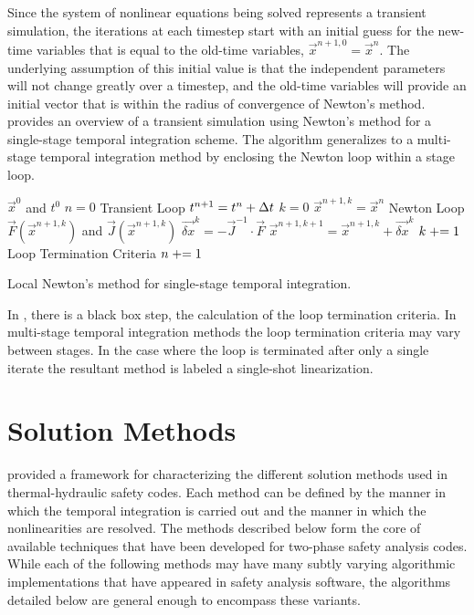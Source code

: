 Since the system of nonlinear equations being solved represents a transient simulation, the iterations at each timestep start with an initial guess for the new-time variables that is equal to the old-time variables, $\vec{x}^{n+1,0} = \vec{x}^{n}$.
The underlying assumption of this initial value is that the independent parameters will not change greatly over a timestep, and the old-time variables will provide an initial vector that is within the radius of convergence of Newton's method.
 provides an overview of a transient simulation using Newton's method for a single-stage temporal integration scheme.
The algorithm generalizes to a multi-stage temporal integration method by enclosing the Newton loop within a stage loop.

\begin{algo}[ht!]
\setlength{\baselineskip}{0.625\baselineskip}
\begin{algorithmic}[1]
\Require $\vec{x}^{0}$ and $t^{0}$
\Set $n = 0$
\Loop \; Transient Loop
    \Set $t^{n+1} = t^{n} + \dt{}$
    \Set $k = 0$
    \Set $\vec{x}^{n+1,k} = \vec{x}^{n}$
    \Loop \; Newton Loop
		\Calculate $\vec{F}(\vec{x}^{n+1,k})$ and $\vec{J}(\vec{x}^{n+1,k})$
		\Calculate $\vec{\delta x}^k = - \vec{J}^{-1}\cdot\vec{F}$
		\Calculate $\vec{x}^{n+1,k+1} = \vec{x}^{n+1, k} + \vec{\delta x}^{k}$
		\Set $k \mathrel{+}= 1$
		\BlackBox Loop Termination Criteria
	\EndLoop
	\Set $n \mathrel{+}= 1$
\EndLoop
\end{algorithmic}
\caption{Local Newton's method for single-stage temporal integration.}
\label{alg:local_newton}
\end{algo}

In , there is a black box step, the calculation of the loop termination criteria.
In multi-stage temporal integration methods the loop termination criteria may vary between stages. 
In the case where the loop is terminated after only a single iterate the resultant method is labeled a single-shot linearization.

\section{Solution Methods}
\label{sect:solution_techniques}

 provided a framework for characterizing the different solution methods used in thermal-hydraulic safety codes. 
Each method can be defined by the manner in which the temporal integration is carried out and the manner in which the nonlinearities are resolved.
The methods described below form the core of available techniques that have been developed for two-phase safety analysis codes. 
While each of the following methods may have many subtly varying algorithmic implementations that have appeared in safety analysis software, the algorithms detailed below are general enough to encompass these variants.

